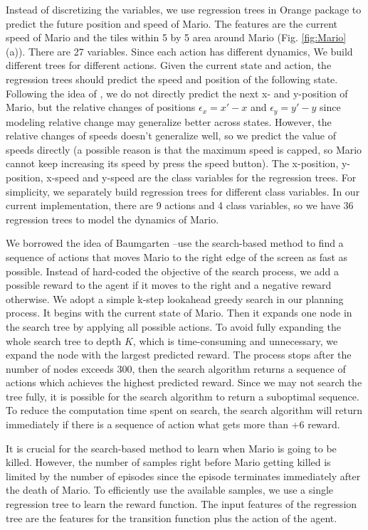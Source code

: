 Instead of discretizing the variables, we use regression trees
in Orange package \cite{Orange04} to predict the future position and speed of Mario.
The features are the current speed of Mario and the tiles within 5 by 5 
area around Mario (Fig. \ref{fig:Mario}(a)). There are 27 variables. 
Since each action has different dynamics, 
We build different trees for different actions. 
Given the current state and action, the regression trees should predict 
the speed and position of the following state. 
Following the idea of \cite{Hester09}, we do not directly predict
the next x- and y-position of Mario, but 
the relative changes of positions $\epsilon_x = x' - x$ and 
$\epsilon_y = y' - y$ since modeling relative change may generalize better across states.
However, the relative changes of speeds doesn't generalize well, so we predict
the value of speeds directly (a possible reason is that the maximum speed is capped, so Mario cannot
keep increasing its speed by press the speed button). 
The x-position, y-position, x-speed and y-speed are the class variables for the regression trees.
For simplicity, we separately build regression trees for different class variables. 
In our current implementation, there are 9 actions and 4 class variables, so we 
have 36 regression trees to model the dynamics of Mario. 

We borrowed the idea of Baumgarten \cite{Robin09}--use
the search-based method to find a sequence of actions that moves Mario to the right edge of the screen as fast as possible.
Instead of hard-coded the objective of the search process, we add a possible reward to the agent if it moves
to the right and a negative reward otherwise.
We adopt a simple k-step lookahead greedy search in our planning process.
It begins with the current state of Mario. 
Then it expands one node in the search tree by applying all possible actions. To avoid fully expanding the whole search tree to 
depth $K$, which is time-consuming and unnecessary, we expand the node
with the largest predicted reward. 
The process stops after the number of nodes exceeds 300, then the search algorithm returns 
a sequence of actions which achieves the highest predicted reward.
Since we may not search the tree fully, it is possible for the search algorithm
to return a suboptimal sequence.
To reduce the computation time spent on search, the search algorithm will return
immediately if there is a sequence of action what gets more than +6 reward.

It is crucial for the search-based method to learn when Mario is going to be killed. 
However, the number of samples right before Mario getting killed is limited by the
number of episodes since the episode terminates immediately after the death of Mario.
To efficiently use the available samples, we use a single regression tree to learn the 
reward function. The input features of the regression tree are
the features for the transition function plus the action of the agent. 


